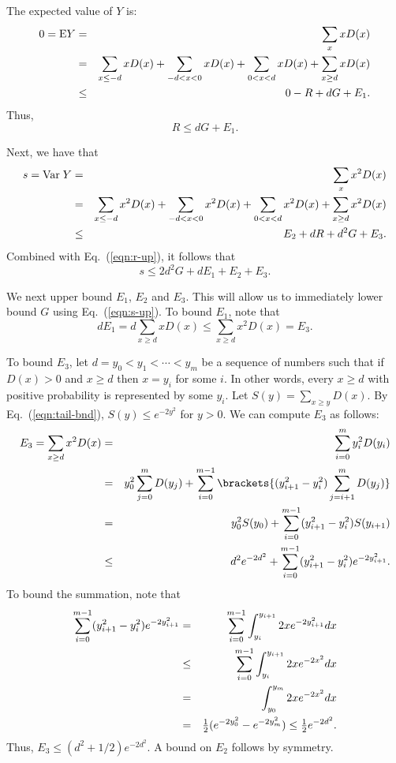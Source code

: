 The expected value of $Y$ is:
\begin{eqnarray*}
0 = {\rm E}Y &=& \sum_x x D(x) \\
 &=& \sum_{x \leq -d} x D(x)
   + \sum_{-d < x < 0} x D(x)
   + \sum_{0 < x < d} x D(x)
   + \sum_{x \geq d} x D(x)\\
 &\leq& 
     0 - R + d G + E_1.
\end{eqnarray*}
Thus,
\begin{equation}  \label{eqn:r-up}
R\leq d G + E_1.
\end{equation}

Next, we have that
\begin{eqnarray*}
s = {\rm Var}\;Y &=& \sum_x x^2 D(x) \\
 &=& \sum_{x \leq -d} x^2 D(x)
   + \sum_{-d < x < 0} x^2 D(x)
   + \sum_{0 < x < d} x^2 D(x)
   + \sum_{x \geq d} x^2 D(x)\\
 &\leq& 
     E_2 + d R + d^2 G + E_3.
\end{eqnarray*}
Combined with Eq.~(\ref{eqn:r-up}), it follows that
\begin{equation}  \label{eqn:s-up}
 s \leq 2d^2 G + d E_1 + E_2 + E_3.
\end{equation}

We next upper bound $E_1$, $E_2$ and $E_3$.
This will allow us to immediately lower bound $G$ using Eq.~(\ref{eqn:s-up}).
To bound $E_1$, note that
\begin{equation}  \label{eqn:e1-up}
d E_1 = d \sum_{x \geq d} x D(x) \leq \sum_{x \geq d} x^2 D(x) = E_3.
\end{equation}

To bound $E_3$, let $d=y_0 < y_1 < \cdots < y_m$ be a sequence of
numbers such that if $D(x)>0$ and $x\geq d$ then $x=y_i$ for some
$i$.  In other words, every $x\geq d$ with positive probability is
represented by some $y_i$.
Let $S(y) = \sum_{x \geq y} D(x)$.
By Eq.~(\ref{eqn:tail-bnd}), $S(y) \leq e^{-2y^2}$ for $y>0$.
We can compute $E_3$ as follows:
\begin{eqnarray*}
E_3 = \sum_{x \geq d} x^2 D(x)
 &=& \sum_{i=0}^m y_i^2 D(y_i) \\
 &=& y_0^2 \sum_{j=0}^m D(y_j)
       + \sum_{i=0}^{m-1} \brackets{(y_{i+1}^2 - y_i^2) \sum_{j=i+1}^{m}D(y_j)}\\
 &=& y_0^2 S(y_0) + \sum_{i=0}^{m-1} (y_{i+1}^2 - y_i^2) S(y_{i+1})\\
 &\leq& d^2 e^{-2d^2} 
    + \sum_{i=0}^{m-1} (y_{i+1}^2 - y_i^2) e^{-2y_{i+1}^2}.
\end{eqnarray*}
To bound the summation, note that
\begin{eqnarray*}
\sum_{i=0}^{m-1} (y_{i+1}^2 - y_i^2) e^{-2y_{i+1}^2}
 &=&
\sum_{i=0}^{m-1} \int_{y_i}^{y_{i+1}} 2 x e^{-2y_{i+1}^2} dx \\
 &\leq&
\sum_{i=0}^{m-1} \int_{y_i}^{y_{i+1}} 2 x e^{-2x^2} dx \\
 &=&
\int_{y_0}^{y_m} 2 x e^{-2x^2} dx \\
 &=&
\mbox{$\frac{1}{2}$} (e^{-2y_0^2} - e^{-2y_m^2}) \leq
\mbox{$\frac{1}{2}$} e^{-2d^2}.
\end{eqnarray*}
Thus, $E_3 \leq (d^2 + 1/2) e^{-2d^2}$.
A bound on $E_2$ follows by symmetry.

